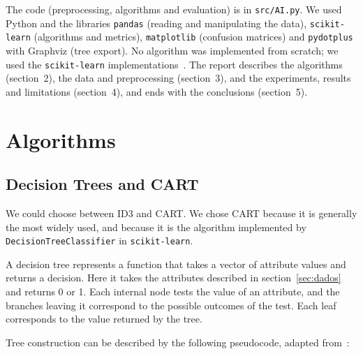 \documentclass[12pt,a4paper]{article}
\newcommand{\code}[1]{\texttt{#1}}
\begin{document}
The code (preprocessing, algorithms and evaluation) is in \code{src/AI.py}. We used Python and the libraries \code{pandas} (reading and manipulating the data), \code{scikit-learn} (algorithms and metrics), \code{matplotlib} (confusion matrices) and \code{pydotplus} with Graphviz (tree export). No algorithm was implemented from scratch; we used the \code{scikit-learn} implementations~\cite{sklearn}. The report describes the algorithms (section~2), the data and preprocessing (section~3), and the experiments, results and limitations (section~4), and ends with the conclusions (section~5).

\clearpage
\section{Algorithms}

\subsection{Decision Trees and CART}

We could choose between ID3 and CART. We chose CART because it is generally the most widely used, and because it is the algorithm implemented by \code{DecisionTreeClassifier} in \code{scikit-learn}.

A decision tree represents a function that takes a vector of attribute values and returns a decision. Here it takes the attributes described in section~\ref{sec:dados} and returns 0 or 1. Each internal node tests the value of an attribute, and the branches leaving it correspond to the possible outcomes of the test. Each leaf corresponds to the value returned by the tree.

Tree construction can be described by the following pseudocode, adapted from~\cite{russell}:
\end{document}
